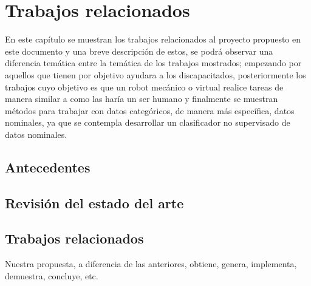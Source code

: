 
\chapter{Trabajos relacionados}

En este cap\'itulo se muestran los trabajos relacionados al proyecto propuesto
 en este documento y una breve descripci\'on de estos, se podr\'a observar una
 diferencia tem\'atica entre la tem\'atica de los trabajos mostrados; empezando 
 por aquellos que tienen por objetivo ayudara a los discapacitados, 
 posteriormente los trabajos cuyo objetivo es que un robot mec\'anico o virtual 
 realice tareas de manera similar a como las har\'ia un ser humano y finalmente 
 se muestran m\'etodos para trabajar con datos categ\'oricos, de manera m\'as 
 espec\'ifica, datos nominales, ya que se contempla desarrollar un clasificador 
 no supervisado de datos nominales.
 
\label{sec:chapter2}
\section{Antecedentes}






\section{Revisi\'{o}n del estado del arte}








\section{Trabajos relacionados}


 Nuestra propuesta, a diferencia de las anteriores, obtiene, genera, implementa, demuestra, concluye, etc.

